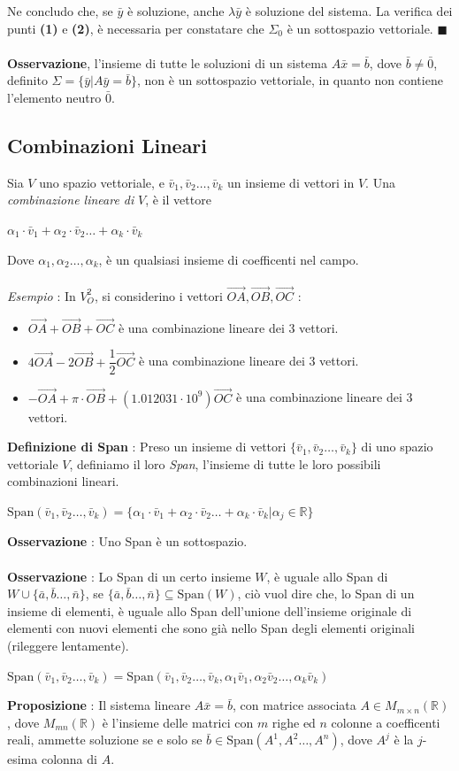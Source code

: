 \documentclass[12pt, letterpaper]{article}
\newcommand{\R}{{\mathbb R}}
\newcommand{\acc}{\\\hphantom{}\\}
\newcommand{\Span}{{\text{Span}}}
\begin{document}
Ne concludo che, se \(\bar y\) è soluzione, anche \(\lambda \bar y\) è soluzione del sistema. La verifica 
dei punti \textbf{(1)} e \textbf{(2)}, è necessaria per constatare che \(\Sigma_0\) è un sottospazio vettoriale. \(\blacksquare\)
\acc \textbf{Osservazione}, l'insieme di tutte le soluzioni di un sistema \(A\bar x = \bar b\), dove 
\(\bar b \ne \bar 0\), definito \(\Sigma = \{\bar y | A\bar y = \bar b\}\), non è un sottospazio vettoriale, in 
quanto non contiene l'elemento neutro \(\bar 0\).
\subsection{Combinazioni Lineari}\label{combLin}
Sia \(V\) uno spazio vettoriale, e \(\bar v_1,\bar v_2\dots, \bar v_k\) un insieme di vettori in \(V\). 
Una \textit{combinazione lineare di }\(V\), è il vettore \begin{center}
    \(\alpha_1\cdot\bar v_1+\alpha_2\cdot\bar v_2\dots+ \alpha_k\cdot\bar v_k\)
\end{center}
Dove \(\alpha_1,\alpha_2\dots,\alpha_k\), è un qualsiasi insieme di coefficenti nel campo.\acc \textit{Esempio} : 
In \(V_O^2\), si considerino i vettori \(\vec{OA},\vec{OB},\vec{OC}\) : \begin{itemize}
    \item \(\vec{OA}+\vec{OB}+\vec{OC}\) è una combinazione lineare dei 3 vettori.
    \item \(4\vec{OA}-2\vec{OB}+\dfrac{1}{2}\vec{OC}\) è una combinazione lineare dei 3 vettori.
    \item \(-\vec{OA}+\pi\cdot \vec{OB}+(1.012031\cdot 10^9)\vec{OC}\) è una combinazione lineare dei 3 vettori.
\end{itemize}
\textbf{Definizione di Span} : Preso un insieme di vettori \(\{\bar v_1,\bar v_2\dots, \bar v_k\}\) di 
uno spazio vettoriale \(V\), definiamo il loro \textit{Span}, l'insieme di tutte le loro possibili combinazioni lineari.
\begin{center}
    \(\Span(\bar v_1,\bar v_2\dots, \bar v_k)=\{\alpha_1\cdot\bar v_1+\alpha_2\cdot\bar v_2\dots+ \alpha_k\cdot\bar v_k|\alpha_j\in \R\}\)
\end{center}
\textbf{Osservazione} : Uno Span è un sottospazio.\acc 
\textbf{Osservazione} : Lo Span di un certo insieme \(W\), è uguale allo Span di \(W\cup \{\bar a,\bar b\dots, \bar n\}\), se 
\(\{\bar a,\bar b\dots, \bar n\}\subseteq \Span(W)\), ciò vuol dire che, lo Span 
di un insieme di elementi, è uguale allo Span dell'unione dell'insieme originale di elementi con nuovi 
elementi che sono già nello Span degli elementi originali (rileggere lentamente).\begin{center}
    \(
    \Span(\bar v_1,\bar v_2\dots, \bar v_k)= \Span(\bar v_1,\bar v_2\dots, \bar v_k,\alpha_1\bar v_1,\alpha_2\bar v_2\dots, \alpha_k\bar v_k)
    \)
\end{center}
\textbf{Proposizione }: Il sistema lineare \(A\bar x = \bar b\), con matrice associata \(A\in M_{m\times n}(\R)\), dove 
\(M_{mn}(\R)\) è l'insieme delle matrici con \(m\) righe ed \(n\) colonne a coefficenti reali, ammette 
soluzione se e solo se \(\bar b \in \Span(A^1,A^2\dots, A^n)\), dove \(A^j\) è la \(j\)-esima colonna di \(A\). 
\end{document}
